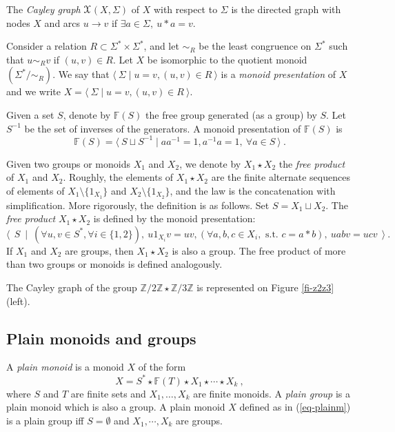 \documentclass[11pt,a4paper]{article}
\theoremstyle{remark}
\def\Blackboardfont{\mathbb}
\newcommand{\moins}{ {\setminus} }
\newcommand{\pres}[2]{\langle \: #1 \mid #2 \: \rangle}
\def\F{{\Blackboardfont F}}
\def\Z{{\Blackboardfont Z}}
\def\eref#1{(\ref{#1})}
\begin{document}
The {\em Cayley graph} $\cal X$$(X,\Sigma)$ of $X$ with respect to
$\Sigma$ is the directed graph with nodes $X$ and arcs
$u\rightarrow v$ if $\exists a\in \Sigma, \ u\ast a =v$.

\medskip

Consider a relation $R\subset \Sigma^*\times \Sigma^*$, and let
$\sim_R$ be the least congruence on $\Sigma^*$ such that $u \sim_R
v$ if $(u,v)\in R$. Let $X$ be isomorphic to the quotient monoid
$(\Sigma^* / \sim_R)$. We say that $\pres{\Sigma}{u=v, (u,v)\in
R}$ is a {\em
  monoid presentation} of $X$
and we write $X=\pres{\Sigma}{u=v, (u,v)\in  R}$.

Given a set $S$, denote by $\F(S)$ the free group generated (as a
group) by $S$. Let $S^{-1}$ be the set of inverses of the
generators. A monoid presentation of $\F(S)$ is
\begin{equation}\label{eq-freegroup}
\F(S) = \pres{S\sqcup S^{-1}}{aa^{-1}=1 ,
  a^{-1}a= 1, \ \forall a\in S}\:.
\end{equation}

Given two groups or monoids $X_1$ and $X_2$, we denote by
$X_1\star X_2$ the {\em free product} of $X_1$ and $X_2$. Roughly,
the elements of $X_1\star X_2$ are the finite alternate sequences
of elements of $X_1\moins\{1_{X_1}\}$ and $X_2\moins\{1_{X_2}\}$,
and the law is the concatenation with simplification. More
rigorously, the definition is as follows. Set $S = X_1\sqcup X_2$.
The {\em free  product} $X_1\star X_2$ is defined by the monoid
presentation:
\begin{equation*}\label{eq-freeproduct}
\pres{\ S \ } {\ (\forall u,v \in S^*, \forall i\in \{1,2\}), \
u1_{X_i}v = uv, (\forall a,b,c \in X_i, \text{ s.t. } c=a\ast b),
\ uabv = ucv \ } \:.
\end{equation*}
If $X_1$ and $X_2$ are groups, then $X_1\star X_2$ is also a
group. The free product of more than two groups or monoids is
defined analogously.

The Cayley graph of the group $\Z/2\Z\star \Z/3\Z$ is
represented on Figure \ref{fi-z2z3} (left). 

\subsection{Plain monoids and groups}\label{sse-pmg}

A {\em plain monoid} is a monoid $X$ of the form
\begin{equation}\label{eq-plainm}
X = S^* \star \F(T) \star X_1\star \cdots \star X_k \:,
\end{equation}
where $S$ and $T$ are finite sets and $X_1,\dots, X_k$ are finite
monoids. A {\em plain group} is a plain monoid which is also a
group. A plain monoid $X$ defined as in \eref{eq-plainm} is a
plain group iff $S=\emptyset$ and $X_1,\cdots, X_k$ are groups.
\end{document}
